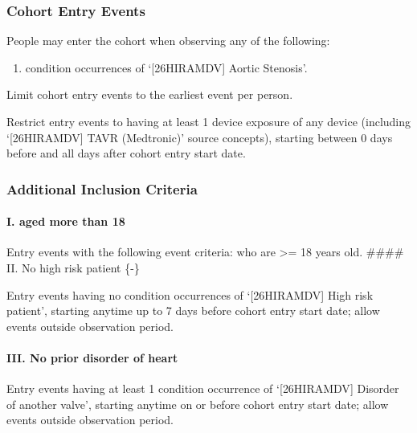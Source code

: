 \documentclass[
  12pt,
]{article}
\providecommand{\tightlist}{%
  \setlength{\itemsep}{0pt}\setlength{\parskip}{0pt}}
\begin{document}
\subsubsection{Cohort Entry Events}\label{cohort-entry-events-5}

People may enter the cohort when observing any of the following:

\begin{enumerate}
\def\labelenumi{\arabic{enumi}.}
\tightlist
\item
  condition occurrences of `{[}26HIRAMDV{]} Aortic Stenosis'.
\end{enumerate}

Limit cohort entry events to the earliest event per person.

Restrict entry events to having at least 1 device exposure of any device
(including `{[}26HIRAMDV{]} TAVR (Medtronic)' source concepts), starting
between 0 days before and all days after cohort entry start date.

\subsubsection{Additional Inclusion
Criteria}\label{additional-inclusion-criteria-5}

\paragraph*{I. aged more than 18}\label{i.-aged-more-than-18-3}

Entry events with the following event criteria: who are \textgreater= 18
years old. \#\#\#\# II. No high risk patient \{-\}

Entry events having no condition occurrences of `{[}26HIRAMDV{]} High
risk patient', starting anytime up to 7 days before cohort entry start
date; allow events outside observation period.

\paragraph*{III. No prior disorder of
heart}\label{iii.-no-prior-disorder-of-heart-3}

Entry events having at least 1 condition occurrence of `{[}26HIRAMDV{]}
Disorder of another valve', starting anytime on or before cohort entry
start date; allow events outside observation period.
\end{document}
